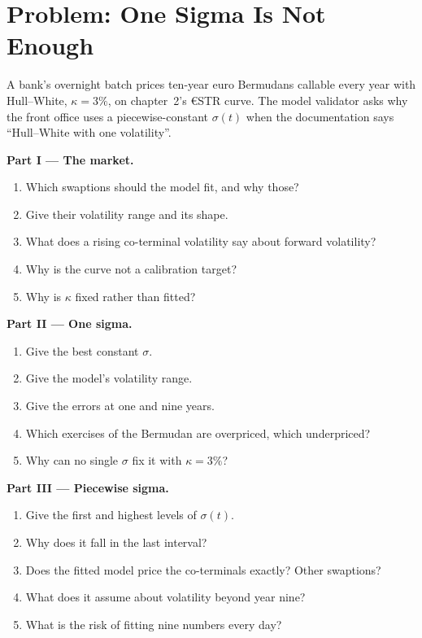 \section{Problem: One Sigma Is Not Enough}

\begin{problem}\label{pb:rc:short-rate-models:1}
A bank's overnight batch prices ten-year euro Bermudans callable every year with
Hull--White, $\kappa=3\%$, on chapter~2's €STR curve. The model validator asks why the
front office uses a piecewise-constant $\sigma(t)$ when the documentation says
``Hull--White with one volatility''.

\medskip\noindent\textbf{Part I --- The market.}
\begin{enumerate}
\item Which swaptions should the model fit, and why those?
\item Give their volatility range and its shape.
\item What does a rising co-terminal volatility say about forward volatility?
\item Why is the curve not a calibration target?
\item Why is $\kappa$ fixed rather than fitted?
\end{enumerate}

\medskip\noindent\textbf{Part II --- One sigma.}
\begin{enumerate}[resume]
\item Give the best constant $\sigma$.
\item Give the model's volatility range.
\item Give the errors at one and nine years.
\item Which exercises of the Bermudan are overpriced, which underpriced?
\item Why can no single $\sigma$ fix it with $\kappa=3\%$?
\end{enumerate}

\medskip\noindent\textbf{Part III --- Piecewise sigma.}
\begin{enumerate}[resume]
\item Give the first and highest levels of $\sigma(t)$.
\item Why does it fall in the last interval?
\item Does the fitted model price the co-terminals exactly? Other swaptions?
\item What does it assume about volatility beyond year nine?
\item What is the risk of fitting nine numbers every day?
\end{enumerate}


\end{problem}
